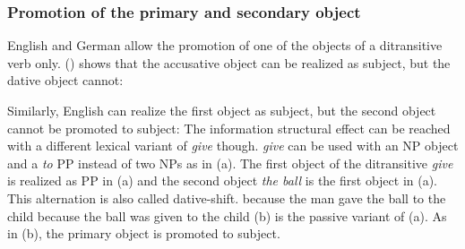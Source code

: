 

\subsubsection{Promotion of the primary and secondary object}

\largerpage
English and German allow the promotion of one of the objects of a ditransitive verb only. ()
shows that the accusative object can be realized as subject, but the dative object cannot:
\eal
{}
\zl

\noindent
Similarly, English can realize the first object as subject, but the second object cannot be promoted
to subject:
\eal
{}
\zl
The information structural effect can be reached with a different lexical variant of \emph{give}
though. \emph{give} can be used with an NP object and a \emph{to} PP instead of two NPs as in
(a). The first object of the ditransitive \emph{give} is realized as PP in (a) and the
second object \emph{the ball} is the first object in (a). This alternation is also called dative-shift.
\eal
\ex because the man gave the ball to the child
\ex because the ball was given to the child
\zl
(b) is the passive variant of (a). As in (b), the primary object is promoted
to subject.

